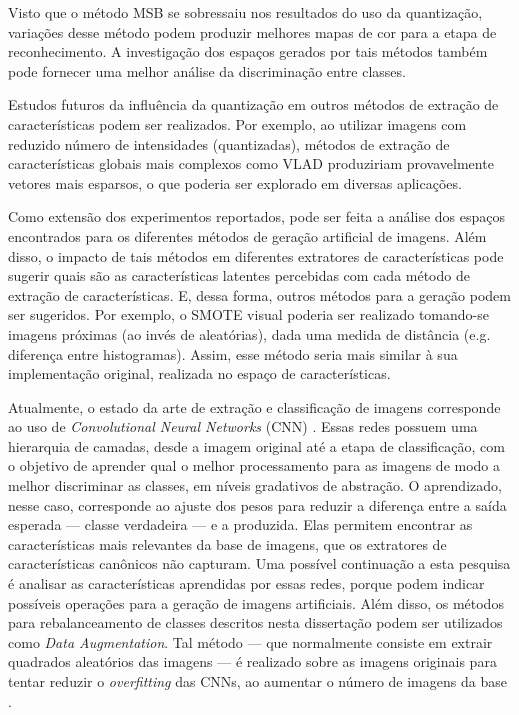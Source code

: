 Visto que o método MSB se sobressaiu nos resultados do uso da quantização, variações desse método podem produzir melhores mapas de cor para a etapa de reconhecimento. A investigação dos espaços gerados por tais métodos também pode fornecer uma melhor análise da discriminação entre classes.

Estudos futuros da influência da quantização em outros métodos de extração de características podem ser realizados. Por exemplo, ao utilizar imagens com reduzido número de intensidades (quantizadas), métodos de extração de características globais mais complexos como VLAD produziriam provavelmente vetores mais esparsos, o que poderia ser explorado em diversas aplicações.

Como extensão dos experimentos reportados, pode ser feita a análise dos espaços encontrados para os diferentes métodos de geração artificial de imagens. Além disso, o impacto de tais métodos em diferentes extratores de características pode sugerir quais são as características latentes percebidas com cada método de extração de características. E, dessa forma, outros métodos para a geração podem ser sugeridos. Por exemplo, o SMOTE visual poderia ser realizado tomando-se imagens próximas (ao invés de aleatórias), dada uma medida de distância (e.g. diferença entre histogramas). Assim, esse método seria mais similar à sua implementação original, realizada no espaço de características.

Atualmente, o estado da arte de extração e classificação de imagens corresponde ao uso de \textit{Convolutional Neural Networks} (CNN) \cite{Schmidhuber2014}. Essas redes possuem uma hierarquia de camadas, desde a imagem original até a etapa de classificação, com o objetivo de aprender qual o melhor processamento para as imagens de modo a melhor discriminar as classes, em níveis gradativos de abstração. O aprendizado, nesse caso, corresponde ao ajuste dos pesos para reduzir a diferença entre a saída esperada --- classe verdadeira --- e a produzida. Elas permitem encontrar as características mais relevantes da base de imagens, que os extratores de características canônicos não capturam. Uma possível continuação a esta pesquisa é analisar as características aprendidas por essas redes, porque podem indicar possíveis operações para a geração de imagens artificiais. Além disso, os métodos para rebalanceamento de classes descritos nesta dissertação podem ser utilizados como \textit{Data Augmentation}. Tal método --- que normalmente consiste em extrair quadrados aleatórios das imagens --- é realizado sobre as imagens originais para tentar reduzir o \textit{overfitting} das CNNs, ao aumentar o número de imagens da base \cite{Krizhevsky}.

